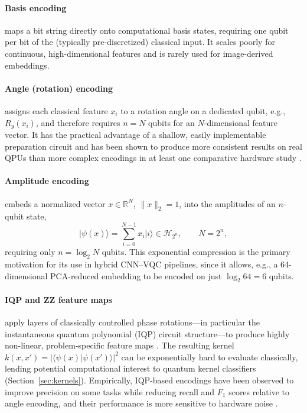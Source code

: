 \documentclass[11pt,a4paper]{article}
\begin{document}
\paragraph{Basis encoding} maps a bit string directly onto computational basis
states, requiring one qubit per bit of the (typically pre-discretized) classical
input.  It scales poorly for continuous, high-dimensional features and is
rarely used for image-derived embeddings.

\paragraph{Angle (rotation) encoding} assigns each classical feature $x_i$ to
a rotation angle on a dedicated qubit, e.g., $R_y(x_i)$, and therefore
requires $n = N$ qubits for an $N$-dimensional feature vector.  It has the
practical advantage of a shallow, easily implementable preparation circuit and
has been shown to produce more consistent results on real QPUs than more
complex encodings in at least one comparative hardware study \cite{qkernel2022}.

\paragraph{Amplitude encoding} embeds a normalized vector
$x \in \mathbb{R}^N$, $\lVert x \rVert_2 = 1$, into the amplitudes of an
$n$-qubit state,
\begin{equation}
  \lvert \psi(x) \rangle = \sum_{i=0}^{N-1} x_i \lvert i \rangle
  \in \mathcal{H}_{2^n}, \qquad N = 2^n,
  \label{eq:amplitude}
\end{equation}
requiring only $n = \log_2 N$ qubits.  This exponential compression is the
primary motivation for its use in hybrid CNN--VQC pipelines, since it allows,
e.g., a 64-dimensional PCA-reduced embedding to be encoded on just
$\log_2 64 = 6$ qubits.

\paragraph{IQP and ZZ feature maps} apply layers of classically controlled
phase rotations---in particular the instantaneous quantum polynomial (IQP)
circuit structure---to produce highly non-linear, problem-specific feature maps
\cite{havlicek2019}.  The resulting kernel $k(x, x') =
|\langle \psi(x) | \psi(x') \rangle|^2$ can be exponentially hard to
evaluate classically, lending potential computational interest to quantum
kernel classifiers (Section~\ref{sec:kernels}).  Empirically, IQP-based
encodings have been observed to improve precision on some tasks while reducing
recall and $F_1$ scores relative to angle encoding, and their performance is
more sensitive to hardware noise \cite{qkernel2022}.
\end{document}
